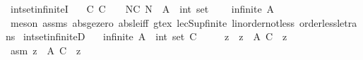 \begin{isabellebody}
\isamarkupfalse%
%
\endisatagproof
{\isafoldproof}%
%
\isadelimproof
\isanewline
%
\endisadelimproof
\isanewline
{}\isamarkupfalse%
\ int{\isacharunderscore}{\kern0pt}set{\isacharunderscore}{\kern0pt}infiniteI{\isacharcolon}{\kern0pt}\isanewline
\ \ \ {\isachardoublequoteopen}{\isasymAnd}C{\isachardot}{\kern0pt}\ C\ {\isasymge}\ {}\ {\isasymLongrightarrow}\ {\isasymexists}N{\isasymge}C{\isachardot}{\kern0pt}\ N\ {\isasymin}\ {\isacharparenleft}{\kern0pt}A\ {\isacharcolon}{\kern0pt}{\isacharcolon}{\kern0pt}\ int\ set{\isacharparenright}{\kern0pt}{\isachardoublequoteclose}\ \isanewline
\ \ \ {\isachardoublequoteopen}infinite\ A{\isachardoublequoteclose}\isanewline
%
\isadelimproof
\ \ %
\endisadelimproof
%
\isatagproof
{}\isamarkupfalse%
\ {\isacharparenleft}{\kern0pt}meson\ assms\ abs{\isacharunderscore}{\kern0pt}ge{\isacharunderscore}{\kern0pt}zero\ abs{\isacharunderscore}{\kern0pt}le{\isacharunderscore}{\kern0pt}iff\ gt{\isacharunderscore}{\kern0pt}ex\ le{\isacharunderscore}{\kern0pt}cSup{\isacharunderscore}{\kern0pt}finite\ linorder{\isacharunderscore}{\kern0pt}not{\isacharunderscore}{\kern0pt}less\ order{\isacharunderscore}{\kern0pt}less{\isacharunderscore}{\kern0pt}le{\isacharunderscore}{\kern0pt}trans{\isacharparenright}{\kern0pt}%
\endisatagproof
{\isafoldproof}%
%
\isadelimproof
\isanewline
%
\endisadelimproof
\isanewline
{}\isamarkupfalse%
\ int{\isacharunderscore}{\kern0pt}set{\isacharunderscore}{\kern0pt}infiniteD{\isacharcolon}{\kern0pt}\isanewline
\ \ \ {\isachardoublequoteopen}infinite\ {\isacharparenleft}{\kern0pt}A\ {\isacharcolon}{\kern0pt}{\isacharcolon}{\kern0pt}\ int\ set{\isacharparenright}{\kern0pt}{\isachardoublequoteclose}\ {\isachardoublequoteopen}C\ {\isasymge}\ {}{\isachardoublequoteclose}\isanewline
\ \ \ z\ \ {\isachardoublequoteopen}z\ {\isasymin}\ A{\isachardoublequoteclose}\ {\isachardoublequoteopen}C\ {\isasymle}\ {\isasymbar}z{\isasymbar}{\isachardoublequoteclose}\isanewline
%
\isadelimproof
%
\endisadelimproof
%
\isatagproof
{}\isamarkupfalse%
\ {\isacharminus}{\kern0pt}\isanewline
\ \ \isacommand{{\isacharbraceleft}{\kern0pt}}\isamarkupfalse%
\isanewline
\ \ \ \ \isamarkupfalse%
\ asm{\isacharcolon}{\kern0pt}\ {\isachardoublequoteopen}{\isasymforall}z\ {\isasymin}\ A{\isachardot}{\kern0pt}\ C\ {\isachargreater}{\kern0pt}\ {\isasymbar}z{\isasymbar}{\isachardoublequoteclose}\isanewline
\ \ \ \ \isamarkupfalse%

\end{isabellebody}
